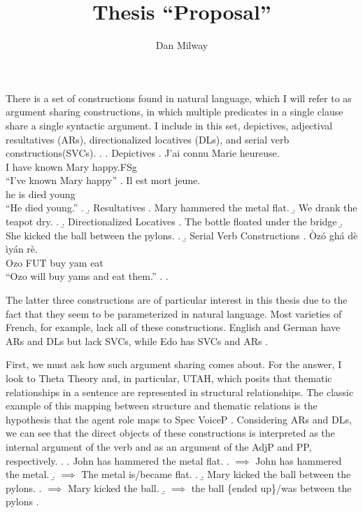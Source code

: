 \documentclass[letterpaper]{article}
\title{Thesis ``Proposal''}
\author{Dan Milway}
\begin{document}
\maketitle

There is a set of constructions found in natural language, which I will refer to as argument sharing constructions, in which multiple predicates in a single clause share a single syntactic argument.
I include in this set, depictives, adjectival resultatives (ARs), directionalized locatives (DLs), and serial verb constructions(SVCs).
\ex.
  \a. Depictives \parencite[French,][]{legendre1997secondary}
    \ag. J'ai connu Marie heureuse.\\
    {I have} known Mary happy.FSg\\
    ``I've known Mary happy''
    \bg. Il est mort jeune.\\
    he is died young\\
    ``He died young.''
    \z.
  \b. Resultatives
    \a. Mary hammered the metal flat.
    \b. We drank the teapot dry.
    \z.
  \b. Directionalized Locatives
    \a. The bottle floated under the bridge
    \b. She kicked the ball between the pylons.
    \z.
  \b. Serial Verb Constructions \parencite[Edo,][]{bakerstewart1999double}
    \ag. \`Oz\'o gh\'a d\`e ìy\'an r\`e.\\
    Ozo FUT buy yam eat\\
    ``Ozo will buy yams and eat them.''
    \z.
  \z.

The latter three constructions are of particular interest in this thesis due to the fact that they seem to be parameterized in natural language.
Most varieties of French, for example, lack all of these constructions. English and German have ARs and DLs but lack SVCs, while Edo has SVCs and ARs \parencite{bakerstewart1999double}.

First, we must ask how such argument sharing comes about.
For the answer, I look to Theta Theory and, in particular,  UTAH, which posits that thematic relationships in a sentence are represented in structural relationships.
The classic example of this mapping between structure and thematic relations is the hypothesis that the agent role maps to Spec VoiceP \parencite{kratzer_severing_1996}.
Considering ARs and DLs, we can see that the direct objects of these constructions is interpreted as the internal argument of the verb and as an argument of the AdjP and PP, respectively.
\ex.
\a. John has hammered the metal flat.
\a. $\implies$ John has hammered the metal.
\b. $\implies$ The metal is/became flat.
\z.
\b. Mary kicked the ball between the pylons.
\a. $\implies$ Mary kicked the ball.
\b. $\implies$ the ball \{ended up\}/was between the pylons
\z.
\end{document}
